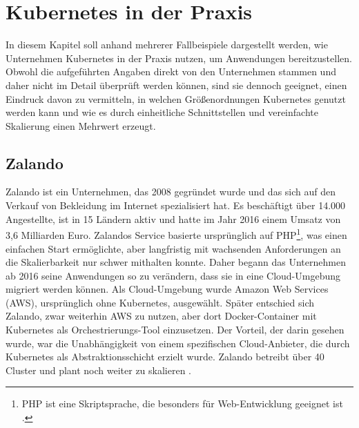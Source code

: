 \documentclass[11pt,a4paper]{article}
\begin{document}
\section{Kubernetes in der Praxis}
\label{sec:Fallbeispiele}
In diesem Kapitel soll anhand mehrerer Fallbeispiele dargestellt werden, wie Unternehmen
Kubernetes in der Praxis nutzen, um Anwendungen bereitzustellen.
Obwohl die aufgeführten Angaben direkt von den Unternehmen stammen und daher nicht im Detail
überprüft werden können, sind sie dennoch geeignet, einen Eindruck davon zu vermitteln,
in welchen Größenordnungen Kubernetes genutzt werden kann und wie es durch
einheitliche Schnittstellen und vereinfachte Skalierung
einen Mehrwert erzeugt.
\subsection{Zalando}
Zalando ist ein Unternehmen, das 2008 gegründet wurde und das sich auf den Verkauf
von Bekleidung im Internet spezialisiert hat. Es beschäftigt über 14.000 Angestellte,
ist in 15 Ländern aktiv und hatte im Jahr 2016 einem Umsatz von 3,6 Milliarden Euro.
Zalandos Service basierte ursprünglich auf PHP\footnote{PHP ist eine Skriptsprache, die besonders für Web-Entwicklung
  geeignet ist \cite{php}.}, was einen einfachen Start ermöglichte,
aber langfristig mit wachsenden Anforderungen an die Skalierbarkeit nur schwer mithalten konnte.
Daher begann das Unternehmen ab 2016 seine Anwendungen so zu verändern, dass sie
in eine Cloud-Umgebung migriert werden können. Als Cloud-Umgebung wurde Amazon Web Services (AWS),
ursprünglich ohne Kubernetes, ausgewählt. Später entschied sich Zalando,
zwar weiterhin AWS zu nutzen, aber dort Docker-Container mit Kubernetes
als Orchestrierungs-Tool einzusetzen. Der Vorteil, der darin gesehen wurde,
war die Unabhängigkeit von einem spezifischen Cloud-Anbieter, die durch
Kubernetes als Abstraktionsschicht erzielt wurde.
Zalando betreibt über 40 Cluster und plant noch weiter zu skalieren \cite{story_zalando}.
\end{document}
